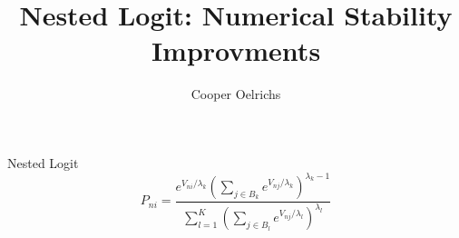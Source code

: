 \documentclass[20pt]{extarticle}
\begin{document}
\title{Nested Logit: Numerical Stability Improvments}
\author{Cooper Oelrichs}

Nested Logit
\[
  P_{ni}=
  \frac{e^{V_{ni}/\lambda_{k}}
  \left(\sum_{j\in B_{k}}e^{V_{nj}/\lambda_{k}}\right)
  ^{\lambda_{k}-1}}
  {\sum_{l=1}^{K}\left(\sum_{j\in B_{l}}e^{V_{nj}/\lambda_{l}}\right)^{\lambda_{l}}}
\]
\end{document}
